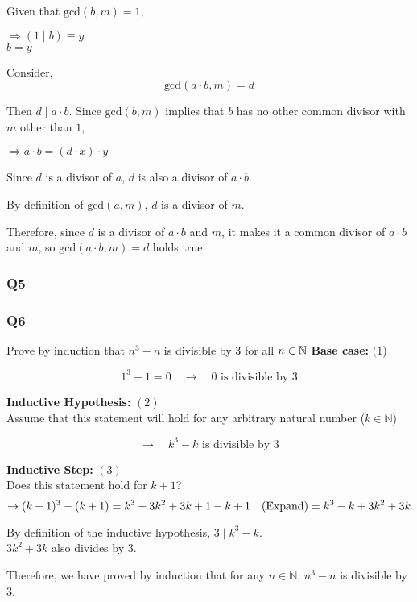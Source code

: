 \documentclass{article}
\begin{document}
Given that $\text{gcd}(b, m) = 1$,

$\Rightarrow (1 \mid b) \equiv y$ \\
$b = y$

Consider,
\[
\text{gcd}(a \cdot b, m) = d
\]

Then $d \mid a \cdot b$. Since $\text{gcd}(b, m)$ implies that $b$ has no other common divisor with $m$ other than $1$,

$\Rightarrow a \cdot b = (d \cdot x) \cdot y$

Since $d$ is a divisor of $a$, $d$ is also a divisor of $a \cdot b$.

By definition of $\text{gcd}(a, m)$, $d$ is a divisor of $m$.

Therefore, since $d$ is a divisor of $a \cdot b$ and $m$, it makes it a common divisor of $a \cdot b$ and $m$, so $\text{gcd}(a \cdot b, m) = d$ holds true.
\subsubsection{Q5}
\subsubsection{Q6}
Prove by induction that $n^{3}-n$ is divisible by 3 for all $n \in \mathbb{N} \\$
\textbf{Base case:} \((1\))

\[
1^3 - 1 = 0 \quad \rightarrow \quad 0 \text{ is divisible by } 3
\]

\textbf{Inductive Hypothesis:} \((2)\) \\
Assume that this statement will hold for any arbitrary natural number (\(k \in \mathbb{N}\))

\[
\rightarrow \quad k^3 - k \text{ is divisible by } 3
\]

\textbf{Inductive Step:} \((3)\) \\
Does this statement hold for \(k+1\)?
\[
\rightarrow (k+1)^3 - (k+1) \\
= k^3 + 3k^2 + 3k + 1 - k + 1 \quad (\text{Expand}) \\
= k^3 - k + 3k^2 + 3k
\]

By definition of the inductive hypothesis, \(3 \mid k^3 - k\). \\
\(3k^2 + 3k\) also divides by \(3\).

Therefore, we have proved by induction that for any \(n \in \mathbb{N}\), \(n^3 - n\) is divisible by \(3\).


\end{document}
